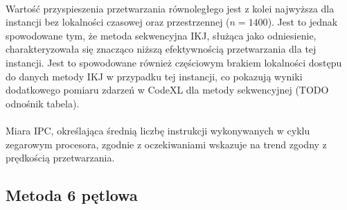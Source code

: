 \documentclass[12pt,a4paper]{article}
\begin{document}
\\
Wartość przyspieszenia przetwarzania równoległego jest z kolei najwyższa dla instancji bez lokalności czasowej oraz przestrzennej ($n=1400$). Jest to jednak spowodowane tym, że metoda sekwencyjna IKJ, służąca jako odniesienie, charakteryzowała się znacząco niższą efektywnością przetwarzania dla tej instancji. Jest to spowodowane również częściowym brakiem lokalności dostępu do danych metody IKJ w przypadku tej instancji, co pokazują wyniki dodatkowego pomiaru zdarzeń w CodeXL dla metody sekwencyjnej (TODO odnośnik tabela).\\
\\
Miara IPC, określająca średnią liczbę instrukcji wykonywanych w cyklu zegarowym procesora, zgodnie z oczekiwaniami wskazuje na trend zgodny z prędkością przetwarzania.


\subsection{Metoda 6 pętlowa}
\end{document}
